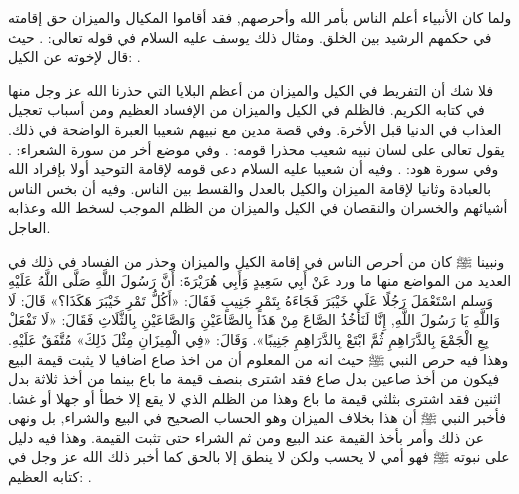 ولما كان الأنبياء أعلم الناس بأمر الله وأحرصهم, فقد أقاموا المكيال والميزان حق إقامته في حكمهم الرشيد بين الخلق. ومثال ذلك يوسف عليه السلام في قوله تعالى:
\quranayah*[12][55]{\footnotesize \surahname*[12]}.
حيث قال لإخوته عن الكيل:
\quranayah*[12][59-60]{\footnotesize \surahname*[12]}.

فلا شك أن التفريط في الكيل والميزان من أعظم البلايا التي حذرنا الله عز وجل منها في كتابه الكريم. فالظلم في الكيل والميزان من الإفساد العظيم ومن أسباب تعجيل العذاب في الدنيا قبل الأخرة. وفي قصة مدين مع نبيهم شعيبا العبرة الواضحة في ذلك. يقول تعالى على لسان نبيه شعيب محذرا قومه:
\quranayah*[7][85]{\footnotesize \surahname*[7]}.
وفي موضع أخر من سورة الشعراء:
\quranayah*[26][181-183]{\footnotesize \surahname*[26]}.
وفي سورة هود:
\quranayah*[11][84-85]{\footnotesize \surahname*[11]}. وفيه أن شعيبا عليه السلام دعى قومه لإقامة التوحيد أولا بإفراد الله بالعبادة وثانيا لإقامة الميزان والكيل بالعدل والقسط بين الناس. وفيه أن بخس الناس أشيائهم والخسران والنقصان في الكيل والميزان من الظلم الموجب لسخط الله وعذابه العاجل.

ونبينا ﷺ كان من أحرص الناس في إقامة الكيل والميزان وحذر من الفساد في ذلك في العديد من المواضع منها ما ورد عَنْ أَبِي سَعِيدٍ وَأَبِي هُرَيْرَةَ: أَنَّ رَسُولَ اللَّهِ صَلَّى اللَّهُ عَلَيْهِ وَسلم اسْتَعْمَلَ رَجُلًا عَلَى خَيْبَرَ فَجَاءَهُ بِتَمْرٍ جَنِيبٍ فَقَالَ: «أَكُلُّ تَمْرِ خَيْبَرَ هَكَذَا؟» قَالَ: لَا وَاللَّهِ يَا رَسُولَ اللَّهِ, إِنَّا لَنَأْخُذُ الصَّاعَ مِنْ هَذَا بِالصَّاعَيْنِ وَالصَّاعَيْنِ بِالثَّلَاثِ فَقَالَ: «لَا تَفْعَلْ بِعِ الْجَمْعَ بِالدَّرَاهِمِ ثُمَّ ابْتَعْ بِالدَّرَاهِمِ جَنِيبًا». وَقَالَ: «فِي الْمِيزَانِ مِثْلَ ذَلِكَ»
{\footnotesize مُتَّفَقٌ عَلَيْهِ}.
وهذا فيه حرص النبي ﷺ حيث انه من المعلوم أن من اخذ صاع اضافيا لا يثبت قيمة البيع فيكون من أخذ صاعين بدل صاع فقد اشترى بنصف قيمة ما باع بينما من أخذ ثلاثة بدل اثنين فقد اشترى بثلثي قيمة ما باع وهذا من الظلم الذي لا يقع إلا خطأ أو جهلا أو غشا. فأخبر النبي ﷺ أن هذا بخلاف الميزان وهو الحساب الصحيح في البيع والشراء, بل ونهى عن ذلك وأمر بأخذ القيمة عند البيع ومن ثم الشراء حتى تثبت القيمة. وهذا فيه دليل على نبوته ﷺ فهو أمي لا يحسب ولكن لا ينطق إلا بالحق كما أخبر ذلك الله عز وجل في كتابه العظيم:
\quranayah*[53][3-4]{\footnotesize \surahname*[53]}.

